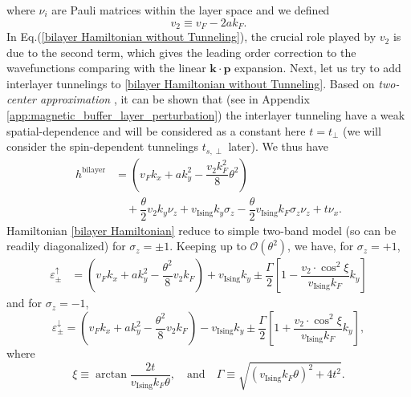 \begin{subappendices}
			where $\nu_i$ are Pauli matrices within the layer space and we defined
			\begin{equation}
				v_2\equiv v_F-2ak_F.\label{eqn:v2_definition}
			\end{equation}
			In Eq.(\ref{bilayer Hamiltonian without Tunneling}), the crucial role played by $v_2$ is due to the second term, which gives the leading order correction to the wavefunctions comparing with the linear $\bm{k\cdot p}$ expansion.
			\indent Next, let us try to add interlayer tunnelings to \eqref{bilayer Hamiltonian without Tunneling}. Based on \emph{two-center approximation} \cite{bistritzer2011moire}, it can be shown that (see in Appendix \ref{app:magnetic_buffer_layer_perturbation}) the interlayer tunneling have a weak spatial-dependence and will be considered as a constant here $t=t_\perp$ (we will consider the spin-dependent tunnelings $t_{s,\perp}$ later). We thus have
			\begin{align}\label{bilayer Hamiltonian}
				h^{\text{bilayer}}&=\left(v_F k_x+ak_y^2-\dfrac{v_2k_F^2}{8}\theta^2\right)\nonumber\\
				&\quad+\dfrac{\theta}{2}v_2 k_y\nu_z+v_{\text{Ising}} k_y\sigma_z-\dfrac{\theta}{2}v_{\text{Ising}} k_F\sigma_z\nu_z+t\nu_x.
			\end{align}
			Hamiltonian \eqref{bilayer Hamiltonian} reduce to simple two-band model \cite{bernevig2013topological} (so can be readily diagonalized) for $\sigma_z=\pm1$. Keeping up to $\mathcal{O}(\theta^2)$, we have, for $\sigma_z=+1$,
			\begin{align*}
				\varepsilon_\pm^\uparrow &=\left(v_F k_x +a k_y^2-\dfrac{\theta^2}{8}v_2 k_F\right)+v_{\text{Ising}}k_y\pm\dfrac{\Gamma}{2}\left[1-\dfrac{v_2\cdot\cos^2\xi}{v_{\text{Ising}} k_F}k_y\right]
			\end{align*}
			and for $\sigma_z=-1$,
			\begin{equation*}
				\varepsilon^\downarrow_\pm=\left(v_F k_x +a k_y^2-\dfrac{\theta^2}{8}v_2 k_F\right)-v_{\text{Ising}}k_y\pm\dfrac{\Gamma}{2}\left[1+\dfrac{v_2\cdot\cos^2\xi}{v_{\text{Ising}} k_F}k_y\right],
			\end{equation*}
			where
			\begin{equation*}
				\xi\equiv \arctan\dfrac{2t}{v_{\text{Ising}} k_F \theta},\quad\text{and}\quad\Gamma\equiv\sqrt{(v_{\text{Ising}}k_F\theta)^2+4t^2}.
			\end{equation*}


\end{subappendices}

